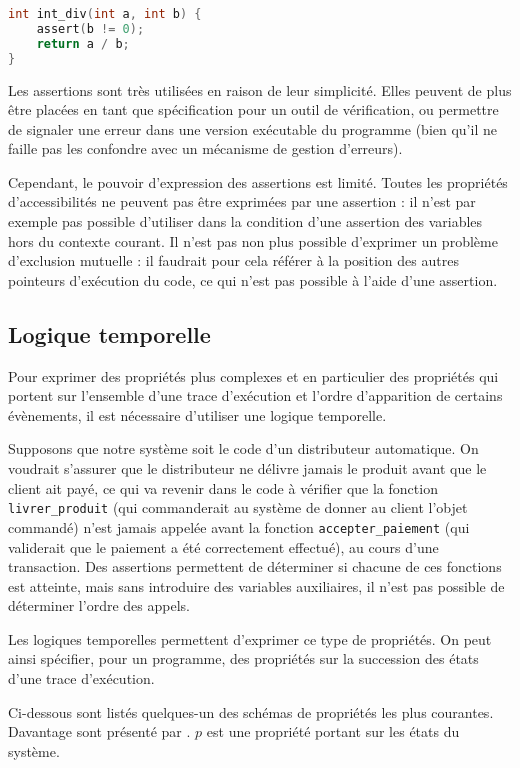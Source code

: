 \begin{lstlisting}[language=C]
int int_div(int a, int b) {
    assert(b != 0);
    return a / b;
}
\end{lstlisting}

Les assertions sont très utilisées en raison de leur simplicité.
Elles peuvent de plus être placées en tant que spécification pour un outil de
vérification, ou permettre de signaler une erreur dans une version exécutable
du programme (bien qu'il ne faille pas les confondre avec un mécanisme de
gestion d'erreurs).

Cependant, le pouvoir d'expression des assertions est limité. Toutes les
propriétés d'accessibilités ne peuvent pas être exprimées par une assertion : il
n'est par exemple pas possible d'utiliser dans la condition d'une assertion des
variables hors du contexte courant. Il n'est pas non plus possible d'exprimer un
problème d'exclusion mutuelle : il faudrait pour cela référer à la position des
autres pointeurs d'exécution du code, ce qui n'est pas possible à l'aide d'une
assertion.

\subsection{Logique temporelle}

Pour exprimer des propriétés plus complexes et en particulier des propriétés qui
portent sur l'ensemble d'une trace d'exécution et l'ordre d'apparition de
certains évènements, il est nécessaire d'utiliser une logique temporelle.

Supposons que notre système soit le code d'un distributeur automatique.
On voudrait s'assurer que le distributeur ne délivre jamais le produit
avant que le client ait payé, ce qui va revenir dans le code à vérifier
que la fonction \texttt{livrer\_produit} (qui commanderait au système
de donner au client l'objet commandé) n'est jamais appelée avant la
fonction \texttt{accepter\_paiement} (qui validerait que le paiement a
été correctement effectué), au cours d'une transaction. Des assertions
permettent de déterminer si chacune de ces fonctions est atteinte, mais
sans introduire des variables auxiliaires, il n'est pas possible de
déterminer l'ordre des appels.

Les logiques temporelles permettent d'exprimer ce type de propriétés. On
peut ainsi spécifier, pour un programme, des propriétés sur la
succession des états d'une trace d'exécution.

Ci-dessous sont listés quelques-un des schémas de propriétés les plus
courantes. Davantage sont présenté par \citep{LTL_scheme}. \(p\) est une
propriété portant sur les états du système.

